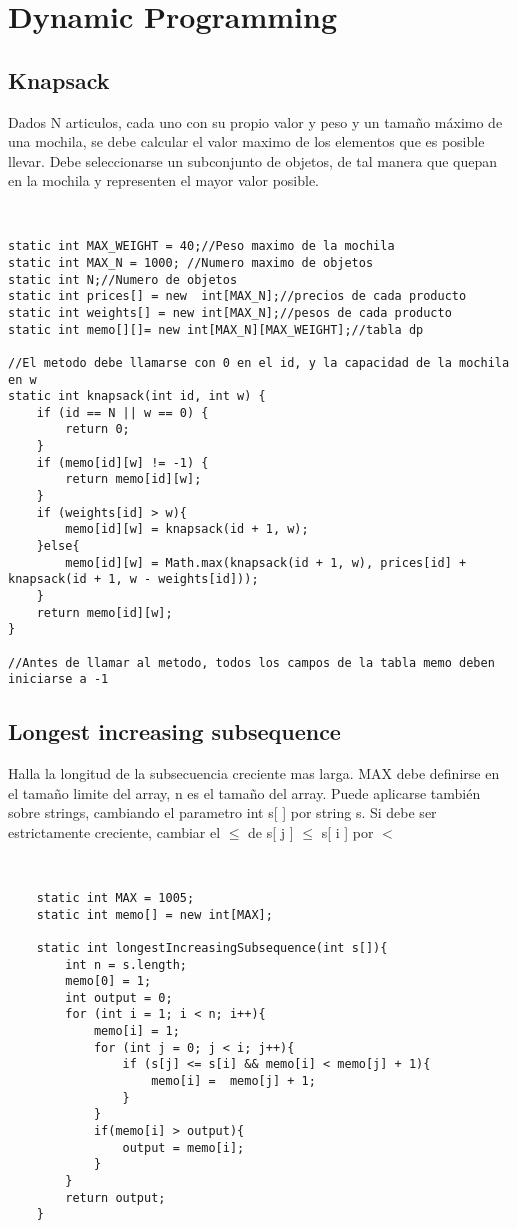 \documentclass[11pt,letterpaper,twocolumn,twosided]{article}
\begin{document}
\section{Dynamic Programming}

\subsection{Knapsack}
Dados N articulos, cada uno con su propio valor y peso y un tama\~no m\'aximo de una mochila, se debe calcular el valor maximo de los elementos que es posible llevar.
Debe seleccionarse un subconjunto de objetos, de tal manera que quepan en la mochila y representen el mayor valor posible.
\begin{lstlisting}


static int MAX_WEIGHT = 40;//Peso maximo de la mochila
static int MAX_N = 1000; //Numero maximo de objetos
static int N;//Numero de objetos 
static int prices[] = new  int[MAX_N];//precios de cada producto
static int weights[] = new int[MAX_N];//pesos de cada producto
static int memo[][]= new int[MAX_N][MAX_WEIGHT];//tabla dp

//El metodo debe llamarse con 0 en el id, y la capacidad de la mochila en w
static int knapsack(int id, int w) {
  	if (id == N || w == 0) {
  		return 0;
  	}
  	if (memo[id][w] != -1) {
  		return memo[id][w];
  	}
  	if (weights[id] > w){
  		memo[id][w] = knapsack(id + 1, w);
  	}else{
  		memo[id][w] = Math.max(knapsack(id + 1, w), prices[id] + knapsack(id + 1, w - weights[id]));
  	}
  	return memo[id][w];
}

//Antes de llamar al metodo, todos los campos de la tabla memo deben iniciarse a -1	
\end{lstlisting}

\subsection{Longest increasing subsequence}
Halla la longitud de la subsecuencia creciente mas larga. MAX debe definirse en el tama\~no  limite del array, n es el tama\~no del array. Puede aplicarse tambi\'en sobre strings, cambiando el parametro int s[ ] por string s. Si debe ser estrictamente creciente, cambiar el $\leq$ de s[ j ] $\leq$ s[ i ] por $<$
\begin{lstlisting}


	static int MAX = 1005;
	static int memo[] = new int[MAX];
	
	static int longestIncreasingSubsequence(int s[]){
		int n = s.length;
		memo[0] = 1;
		int output = 0;
		for (int i = 1; i < n; i++){
			memo[i] = 1;
			for (int j = 0; j < i; j++){
				if (s[j] <= s[i] && memo[i] < memo[j] + 1){
					memo[i] =  memo[j] + 1;
				} 
			}
			if(memo[i] > output){
				output = memo[i];
			}
		}
		return output;
	}
\end{lstlisting}
\end{document}

